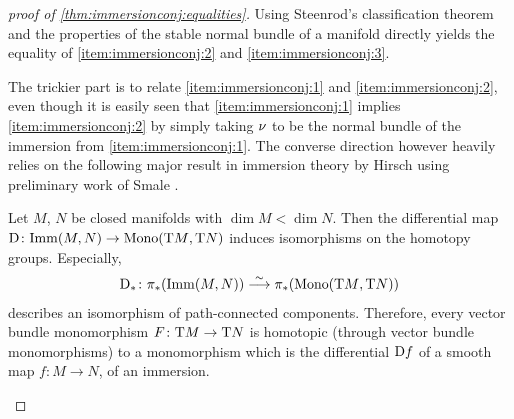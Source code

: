 \begin{proof}[proof of \autoref{thm:immersionconj:equalities}]
  Using Steenrod's classification theorem
  and the properties of the stable normal bundle of a manifold
  directly yields the equality of \ref{item:immersionconj:2} and
  \ref{item:immersionconj:3}.

  The trickier part is to relate \ref{item:immersionconj:1} and
  \ref{item:immersionconj:2}, even though it is easily seen that
  \ref{item:immersionconj:1} implies \ref{item:immersionconj:2} by
  simply taking $\nu_{}$ to be the normal bundle of the immersion from
  \ref{item:immersionconj:1}. The converse direction however heavily
  relies on the following major result in immersion theory by Hirsch
  using preliminary work of Smale
  \cite[Sections~5 and 6]{hirschimmersions}.
  
  \begin{Thm}
    Let $M$, $N$ be closed manifolds with $\dim M<\dim N$.
    Then the differential map
    $\mathrm{D}\colon \mathrm{Imm}({M},{N})\to \mathrm{Mono}({\mathrm{T}M},{\mathrm{T}N})$
    induces isomorphisms on the homotopy groups.
    Especially,
    \begin{gather*}
      \mathrm{D}_*\colon
      \pi_*(\mathrm{Imm}({M},{N})) \overset\sim{\longrightarrow} \pi_*(\mathrm{Mono}({\mathrm{T}M},{\mathrm{T}N}))
    \end{gather*}
    describes an isomorphism of path-connected components.
    Therefore, every vector bundle monomorphism
    $F\colon\mathrm{T}M\to\mathrm{T}N$ is homotopic (through vector bundle
    monomorphisms) to a monomorphism which is the differential
    $\mathrm{D} f$ of a smooth map $f\colon M\to N$, \idest of an
    immersion.
  \end{Thm}
\end{proof}


